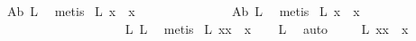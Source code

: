 \begin{isabellebody}
\ A{}b\ L{}\ \isamarkupfalse%
\ metis%
\endisatagproof
{\isafoldproof}%
%
\isadelimproof
%
\endisadelimproof
\isanewline
{}\isamarkupfalse%
\ L{}{}{\isacharcolon}\ {\isachardoublequoteopen}{\isasymbox}{\isasymbox}{\isacharparenleft}{\isacharparenleft}{\isasymbox}x{\isacharparenright}{\isasymbox}{\isacharparenright}\ {\isasymapprox}\ {\isasymbox}{\isasymbox}{\isacharparenleft}x{\isasymbox}{\isacharparenright}{\isachardoublequoteclose}%
\isadelimproof
\ \ \ \ \ \ \ \ \ \ \ \ \ %
\endisadelimproof
%
\isatagproof
{}\isamarkupfalse%
\ A{}b\ L{}{}\ \isamarkupfalse%
\ metis%
\endisatagproof
{\isafoldproof}%
%
\isadelimproof
%
\endisadelimproof
\isanewline
{}\isamarkupfalse%
\ L{}{}{\isacharcolon}\ {\isachardoublequoteopen}{\isasymbox}{\isasymbox}{\isacharparenleft}{\isacharparenleft}{\isasymbox}x{\isacharparenright}{\isasymbox}{\isacharparenright}\ {\isasymapprox}\ {\isasymbox}x{\isachardoublequoteclose}%
\isadelimproof
\ \ \ \ \ \ \ \ \ \ \ \ \ \ \ \ \ \ %
\endisadelimproof
%
\isatagproof
{}\isamarkupfalse%
\ L{}{}\ L{}\ \isamarkupfalse%
\ metis%
\endisatagproof
{\isafoldproof}%
%
\isadelimproof
%
\endisadelimproof
\isanewline
{}\isamarkupfalse%
\ L{}{}{\isacharcolon}\ {\isachardoublequoteopen}{\isacharparenleft}{\isasymbox}{\isasymbox}{\isacharparenleft}{\isacharparenleft}{\isasymbox}x{\isacharparenright}{\isasymbox}{\isacharparenright}{\isacharparenright}{\isasymcdot}{\isacharparenleft}{\isacharparenleft}{\isasymbox}x{\isacharparenright}{\isasymbox}{\isacharparenright}\ {\isasymapprox}\ {\isacharparenleft}{\isacharparenleft}{\isasymbox}x{\isacharparenright}{\isasymbox}{\isacharparenright}{\isachardoublequoteclose}%
\isadelimproof
\ \ %
\endisadelimproof
%
\isatagproof
{}\isamarkupfalse%
\ L{}\ \isamarkupfalse%
\ auto%
\endisatagproof
{\isafoldproof}%
%
\isadelimproof
%
\endisadelimproof
\ \ \ \isanewline
{}\isamarkupfalse%
\ L{}{}{\isacharcolon}\ {\isachardoublequoteopen}{\isacharparenleft}{\isasymbox}x{\isacharparenright}{\isasymcdot}{\isacharparenleft}{\isacharparenleft}{\isasymbox}x{\isacharparenright}{\isasymbox}{\isacharparenright}\ {\isasymapprox}\ {\isacharparenleft}{\isasymbox}x{\isacharparenright}{\isasymbox}{\isachardoublequoteclose}%
\isadelimproof
\ \ \ \ \ \ \ \ \ \ \ \ %
\endisadelimproof

\end{isabellebody}
